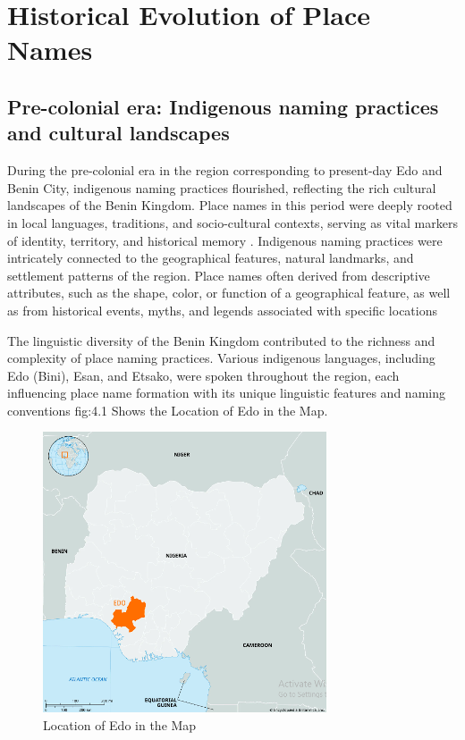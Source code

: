 \chapter{Historical Evolution of Place Names}
\section*{Pre-colonial era: Indigenous naming practices and cultural landscapes}
During the pre-colonial era in the region corresponding to present-day Edo and Benin City, indigenous naming practices flourished, reflecting the rich cultural landscapes of the Benin Kingdom. Place names in this period were deeply rooted in local languages, traditions, and socio-cultural contexts, serving as vital markers of identity, territory, and historical memory \cite{Agheyisi}.
Indigenous naming practices were intricately connected to the geographical features, natural landmarks, and settlement patterns of the region. Place names often derived from descriptive attributes, such as the shape, color, or function of a geographical feature, as well as from historical events, myths, and legends associated with specific locations \cite{egharevba1968short}

The linguistic diversity of the Benin Kingdom contributed to the richness and complexity of place naming practices. Various indigenous languages, including Edo (Bini), Esan, and Etsako, were spoken throughout the region, each influencing place name formation with its unique linguistic features and naming conventions \cite{egharevba1968short} fig:4.1 Shows the Location of Edo in the Map. 

\begin{figure}
    \centering
    \includegraphics[width=0.9\linewidth]{Location of Edo in the Map.png}
    \caption{Location of Edo in the Map}
    \label{fig:loc of edo in map}
\end{figure}
\clearpage

